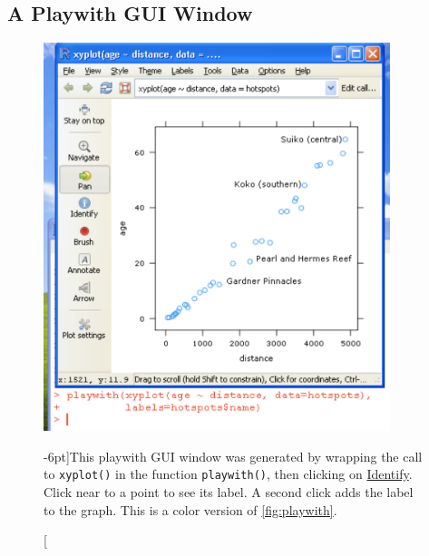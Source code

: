 \documentclass{tufte-book}\usepackage[]{graphicx}\usepackage[]{color}
\begin{document}
\subsection*{A Playwith GUI Window}

\enlargethispage{30pt}

\begin{figure}[h]
\centerline{\includegraphics[width=0.9\textwidth]{colorArt/playwith}}%
\caption[][-6pt]{This playwith GUI window was generated by wrapping the call
  to \texttt{xyplot()} in the function \texttt{playwith()}, then
  clicking on \underline{Identify}. Click near to a point to see its
  label. A second click adds the label to the graph.  This is a color version
of \ref{fig:playwith}.\label{col:playwith}}
\end{figure}
\end{document}
